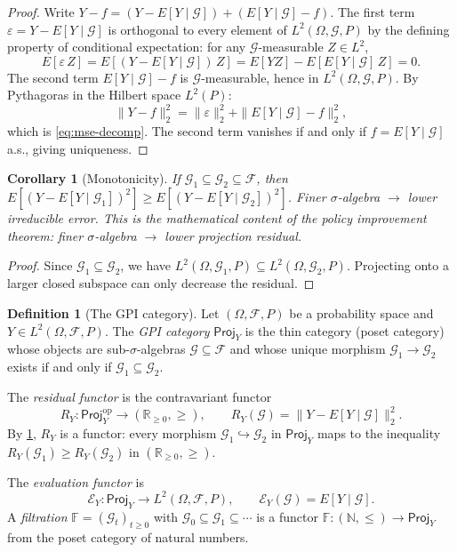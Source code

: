 \documentclass[12pt]{amsart}
\newtheorem{corollary}[theorem]{Corollary}
\theoremstyle{definition}
\newtheorem{definition}[theorem]{Definition}
\theoremstyle{remark}
\newcommand{\R}{\mathbb{R}}
\newcommand{\cF}{\mathcal{F}}
\newcommand{\Proj}{\mathsf{Proj}}
\begin{document}
\begin{proof}
Write $Y - f = (Y - E[Y \mid \mathcal{G}]) + (E[Y \mid \mathcal{G}] - f)$. The first term $\varepsilon = Y - E[Y \mid \mathcal{G}]$ is orthogonal to every element of $L^2(\Omega, \mathcal{G}, P)$ by the defining property of conditional expectation: for any $\mathcal{G}$-measurable $Z \in L^2$,
\[
E[\varepsilon \, Z] = E[(Y - E[Y \mid \mathcal{G}]) \, Z] = E[YZ] - E[E[Y \mid \mathcal{G}] \, Z] = 0.
\]
The second term $E[Y \mid \mathcal{G}] - f$ is $\mathcal{G}$-measurable, hence in $L^2(\Omega, \mathcal{G}, P)$. By Pythagoras in the Hilbert space $L^2(P)$:
\[
\|Y - f\|_2^2 = \|\varepsilon\|_2^2 + \|E[Y \mid \mathcal{G}] - f\|_2^2,
\]
which is \eqref{eq:mse-decomp}. The second term vanishes if and only if $f = E[Y \mid \mathcal{G}]$ a.s., giving uniqueness.
\end{proof}

\begin{corollary}[Monotonicity]\label{cor:monotonicity}
If $\mathcal{G}_1 \subseteq \mathcal{G}_2 \subseteq \cF$, then $E[(Y - E[Y \mid \mathcal{G}_1])^2] \geq E[(Y - E[Y \mid \mathcal{G}_2])^2]$. Finer $\sigma$-algebra $\to$ lower irreducible error. This is the mathematical content of the \emph{policy improvement theorem}: finer $\sigma$-algebra $\to$ lower projection residual.
\end{corollary}

\begin{proof}
Since $\mathcal{G}_1 \subseteq \mathcal{G}_2$, we have $L^2(\Omega, \mathcal{G}_1, P) \subseteq L^2(\Omega, \mathcal{G}_2, P)$. Projecting onto a larger closed subspace can only decrease the residual.
\end{proof}

\begin{definition}[The GPI category]\label{def:gpi-category}
Let $(\Omega, \cF, P)$ be a probability space and $Y \in L^2(\Omega, \cF, P)$.
The \emph{GPI category} $\Proj_Y$ is the thin category (poset category) whose
objects are sub-$\sigma$-algebras $\mathcal{G} \subseteq \cF$ and whose unique
morphism $\mathcal{G}_1 \to \mathcal{G}_2$ exists if and only if
$\mathcal{G}_1 \subseteq \mathcal{G}_2$.

The \emph{residual functor} is the contravariant functor
\[
R_Y : \Proj_Y^{\mathrm{op}} \to (\R_{\geq 0}, \geq), \qquad
R_Y(\mathcal{G}) = \|Y - E[Y \mid \mathcal{G}]\|_2^2.
\]
By \cref{cor:monotonicity}, $R_Y$ is a functor: every morphism
$\mathcal{G}_1 \hookrightarrow \mathcal{G}_2$ in $\Proj_Y$ maps to the
inequality $R_Y(\mathcal{G}_1) \geq R_Y(\mathcal{G}_2)$ in
$(\R_{\geq 0}, \geq)$.

The \emph{evaluation functor} is
\[
\mathcal{E}_Y : \Proj_Y \to L^2(\Omega, \cF, P), \qquad
\mathcal{E}_Y(\mathcal{G}) = E[Y \mid \mathcal{G}].
\]
A \emph{filtration} $\mathbb{F} = (\mathcal{G}_t)_{t \geq 0}$ with
$\mathcal{G}_0 \subseteq \mathcal{G}_1 \subseteq \cdots$ is a functor
$\mathbb{F} : (\mathbb{N}, \leq) \to \Proj_Y$ from the poset category of
natural numbers.
\end{definition}
\end{document}
